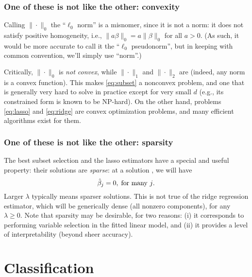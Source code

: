 \documentclass{article}
\begin{document}
\subsubsection{One of these is not like the other: convexity}

Calling $\|\cdot\|_0$ the ``$\ell_0$ norm'' is a misnomer, since it is not a
norm: it does not satisfy positive homogeneity, i.e., $\|a\beta\|_0 =
a\|\beta\|_0$ for all $a > 0$. (As such, it would be more accurate to call it
the ``$\ell_0$ pseudonorm'', but in keeping with common convention, we'll simply
use ``norm''.)   

Critically, $\|\cdot\|_0$ is \emph{not convex}, while $\|\cdot\|_1$ and
$\|\cdot\|_2$ are (indeed, any norm is a convex function). This makes
\eqref{eq:subset} a nonconvex problem, and one that is generally very hard to
solve in practice except for very small $d$ (e.g., its constrained form is known
to be NP-hard). On the other hand, problems \eqref{eq:lasso} and
\eqref{eq:ridge} are convex optimization problems, and many efficient
algorithms exist for them.   

\subsubsection{One of these is not like the other: sparsity}

The best subset selection and the lasso estimators have a special and useful 
property: their solutions are \emph{sparse}: at a solution \smash{$\hbeta$}, we
will have 
\[
\hat{\beta}_j = 0, \; \text{for many $j$}.
\]
Larger $\lambda$ typically means sparser solutions. This is not true of the
ridge regression estimator, which will be generically dense (all nonzero
components), for any $\lambda \geq0$. Note that sparsity may be desirable, for
two reasons: (i) it corresponds to performing variable selection in the fitted
linear model, and (ii) it provides a level of interpretability (beyond sheer
accuracy).   

\section{Classification}

\def\hC{\hat{C}}
\def\hh{\hat{h}}
\end{document}
